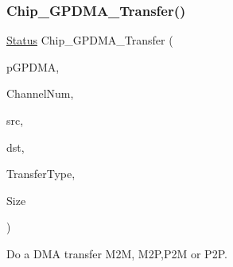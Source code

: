 \subsubsection{\texorpdfstring{Chip\+\_\+\+G\+P\+D\+M\+A\+\_\+\+Transfer()}{Chip\_GPDMA\_Transfer()}}
{\footnotesize\ttfamily \hyperlink{group___l_p_c___types___public___types_ga67a0db04d321a74b7e7fcfd3f1a3f70b}{Status} Chip\+\_\+\+G\+P\+D\+M\+A\+\_\+\+Transfer (\begin{DoxyParamCaption}\item[{\hyperlink{struct_l_p_c___g_p_d_m_a___t}{L\+P\+C\+\_\+\+G\+P\+D\+M\+A\+\_\+T} $\ast$}]{p\+G\+P\+D\+MA,  }\item[{uint8\+\_\+t}]{Channel\+Num,  }\item[{uint32\+\_\+t}]{src,  }\item[{uint32\+\_\+t}]{dst,  }\item[{\hyperlink{group___g_p_d_m_a__18_x_x__43_x_x_ga2cb59b641cd840f22780c44be1208133}{G\+P\+D\+M\+A\+\_\+\+F\+L\+O\+W\+\_\+\+C\+O\+N\+T\+R\+O\+L\+\_\+T}}]{Transfer\+Type,  }\item[{uint32\+\_\+t}]{Size }\end{DoxyParamCaption})}



Do a D\+MA transfer M2M, M2P,P2M or P2P. 


